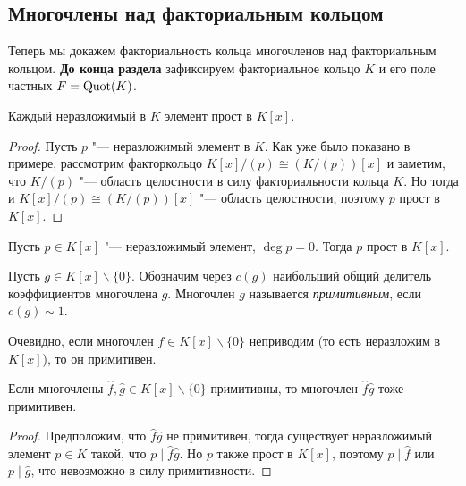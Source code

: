 \subsection{Многочлены над факториальным кольцом}

Теперь мы докажем факториальность кольца многочленов над факториальным кольцом. \textbf{До конца раздела} зафиксируем факториальное кольцо $K$ и его поле частных $F = \operatorname{Quot}(K)$.

\begin{proposition}
	Каждый неразложимый в $K$ элемент прост в $K[x]$.
\end{proposition}

\begin{proof}
	Пусть $p$ "--- неразложимый элемент в $K$. Как уже было показано в примере, рассмотрим факторкольцо $K[x] / (p) \cong (K / (p))[x]$ и заметим, что $K / (p)$ "--- область целостности в силу факториальности кольца $K$. Но тогда и $K[x] / (p) \cong (K / (p))[x]$ "--- область целостности, поэтому $p$ прост в $K[x]$.
\end{proof}

\begin{corollary}
	Пусть $p \in K[x]$ "--- неразложимый элемент, $\deg{p} = 0$. Тогда $p$ прост в $K[x]$.
\end{corollary}

\begin{definition}
	Пусть $g \in K[x] \backslash \{0\}$. Обозначим через $c(g)$ наибольший общий делитель коэффициентов многочлена $g$. Многочлен $g$ называется \textit{примитивным}, если $c(g) \sim 1$.
\end{definition}

\begin{note}
	Очевидно, если многочлен $f \in K[x] \backslash \{0\}$ неприводим (то есть неразложим в $K[x]$), то он примитивен.
\end{note}

\begin{proposition}
	Если многочлены $\widehat{f}, \widehat{g} \in K[x] \backslash \{0\}$ примитивны, то многочлен $\widehat{f}\widehat{g}$ тоже примитивен.
\end{proposition}

\begin{proof}
	Предположим, что $\widehat{f}\widehat{g}$ не примитивен, тогда существует неразложимый элемент $p \in K$ такой, что $p \mid \widehat{f}\widehat{g}$. Но $p$ также прост в $K[x]$, поэтому $p \mid \widehat{f}$ или $p \mid \widehat{g}$, что невозможно в силу примитивности.
\end{proof}

